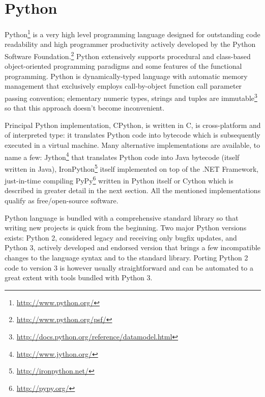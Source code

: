 \section{Python}

Python\footnote{\url{http://www.python.org/}} is a very high level programming language designed for
outstanding code readability and high programmer productivity actively developed by the
Python Software Foundation.\footnote{\url{http://www.python.org/psf/}} Python extensively supports
procedural and class-based object-oriented programming paradigms and some features of the functional
programming. Python is dynamically-typed language with automatic memory management that exclusively employs
call-by-object function call parameter passing convention; elementary numeric types, strings and
tuples are immutable\footnote{\url{http://docs.python.org/reference/datamodel.html}} so that this
approach doesn't become inconvenient.

Principal Python
implementation, CPython, is written in C, is cross-platform and of interpreted type: it translates
Python code into bytecode which is subsequently executed in a virtual machine. Many alternative
implementations are available, to name a few: Jython\footnote{\url{http://www.jython.org/}} that
translates Python code into Java bytecode (itself written in Java),
IronPython\footnote{\url{http://ironpython.net/}} itself implemented on top of the .NET Framework,
just-in-time compiling PyPy\footnote{\url{http://pypy.org/}} written in Python itself or
Cython which is described in greater detail in the next section. All the
mentioned implementations qualify as free/open-source software.

Python language is bundled with a comprehensive standard library so that writing new projects is quick
from the beginning. Two major Python versions exists: Python 2, considered legacy and receiving only
bugfix updates, and Python 3, actively developed and endorsed version that brings a few incompatible
changes to the language syntax and to the standard library. Porting Python 2 code to version 3 is
however usually straightforward and can be automated to a great extent with tools bundled with
Python 3.

